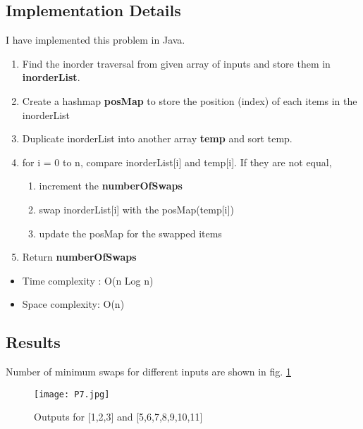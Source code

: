 \documentclass[11pt,a4paper]{article}
\begin{document}
\subsection{Implementation Details}\label{sec:details7}
I have implemented this problem in Java.
\begin{enumerate}
  \item Find the inorder traversal from given array of inputs and store them in \textbf{inorderList}.
  \item Create a hashmap \textbf{posMap} to store the position (index) of each items in the inorderList
  \item Duplicate inorderList into another array \textbf{temp} and sort temp.
  \item for i = 0 to n, compare inorderList[i] and temp[i]. If they are not equal,
  \begin{enumerate}
      \item increment the \textbf{numberOfSwaps}
      \item swap inorderList[i] with the posMap(temp[i])
      \item update the posMap for the swapped items
  \end{enumerate}
  \item Return \textbf{numberOfSwaps}
\end{enumerate}
\begin{itemize}
    \item Time complexity : O(n Log n)
     \item Space complexity: O(n)
\end{itemize}

\subsection{Results}\label{sec:results7}
Number of minimum swaps for different inputs are shown in fig. \ref{fig:output_7}
\begin{figure}[ht]
\texttt{[image: P7.jpg]}
\centering
\caption{Outputs for [1,2,3] and [5,6,7,8,9,10,11]}
\label{fig:output_7}
\end{figure}
\end{document}
